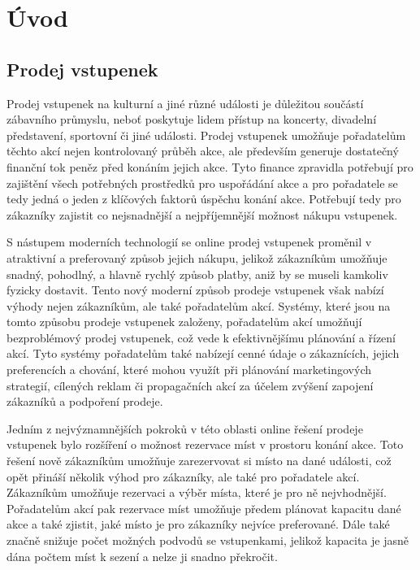 \chapter*{Úvod}

\section*{Prodej vstupenek}
\label{sec:uvod-prodej-vstupenek}
Prodej vstupenek na kulturní a jiné různé události je důležitou součástí zábavního průmyslu, neboť poskytuje lidem přístup na koncerty, divadelní představení, sportovní či jiné události.
Prodej vstupenek umožňuje pořadatelům těchto akcí nejen kontrolovaný průběh akce, ale především generuje dostatečný finanční tok peněz před konáním jejich akce.
Tyto finance zpravidla potřebují pro zajištění všech potřebných prostředků pro uspořádání akce a pro pořadatele se tedy jedná o jeden z klíčových faktorů úspěchu konání akce.
Potřebují tedy pro zákazníky zajistit co nejsnadnější a nejpříjemnější možnost nákupu vstupenek.

S nástupem moderních technologií se online prodej vstupenek proměnil v atraktivní a preferovaný způsob jejich nákupu, jelikož zákazníkům umožňuje snadný, pohodlný, a hlavně rychlý způsob platby, aniž by se museli kamkoliv fyzicky dostavit.
Tento nový moderní způsob prodeje vstupenek však nabízí výhody nejen zákazníkům, ale také pořadatelům akcí.
Systémy, které jsou na tomto způsobu prodeje vstupenek založeny, pořadatelům akcí umožňují bezproblémový prodej vstupenek, což vede k efektivnějšímu plánování a řízení akcí.
Tyto systémy pořadatelům také nabízejí cenné údaje o zákaznících, jejich preferencích a chování, které mohou využít při plánování marketingových strategií, cílených reklam či propagačních akcí za účelem zvýšení zapojení zákazníků a podpoření prodeje.

Jedním z nejvýznamnějších pokroků v této oblasti online řešení prodeje vstupenek bylo rozšíření o možnost rezervace míst v prostoru konání akce.
Toto řešení nově zákazníkům umožňuje zarezervovat si místo na dané události, což opět přináší několik výhod pro zákazníky, ale také pro pořadatele akcí.
Zákazníkům umožňuje rezervaci a výběr místa, které je pro ně nejvhodnější.
Pořadatelům akcí pak rezervace míst umožňuje předem plánovat kapacitu dané akce a také zjistit, jaké místo je pro zákazníky nejvíce preferované.
Dále také značně snižuje počet možných podvodů se vstupenkami, jelikož kapacita je jasně dána počtem míst k sezení a nelze ji snadno překročit.

